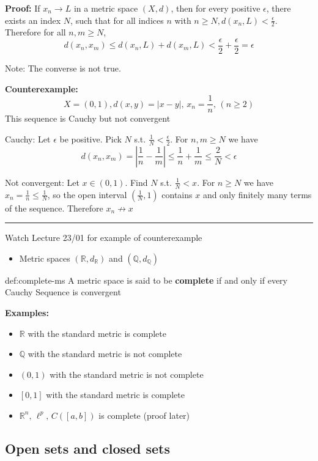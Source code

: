 \documentclass{article}
\begin{document}
\textbf{Proof: } If $x_{n}\to L$ in a metric space $(X,d)$, then for every positive $\epsilon$, there exists an index $N$, such that for all indices $n$ with $n\ge N, d(x_{n}, L) < \frac{\epsilon}{2}$. Therefore for all $n,m\ge N$,
\[d(x_{n}, x_{m})\le d(x_{n}, L) + d(x_{m}, L) < \frac{\epsilon}{2} +  \frac{\epsilon}{2} = \epsilon\]

Note: The converse is not true.

\textbf{Counterexample: }
\[X = (0,1), d(x,y) = \lvert x - y \rvert,\,x_{n} = \frac{1}{n},\,(n\ge 2)\]
This sequence is Cauchy but not convergent

Cauchy: Let $\epsilon$ be positive. Pick $N$ s.t. $\frac{1}{N} < \frac{\epsilon}{2}$. For $n,m\ge N$ we have
\[d(x_{n}, x_{m}) = \left\lvert \frac{1}{n} - \frac{1}{m} \right\rvert \le \frac{1}{n} + \frac{1}{m} \le \frac{2}{N} < \epsilon\]

Not convergent: Let $x\in (0,1)$. Find $N$ s.t. $\frac{1}{N}< x$. For $n\ge N$ we have $x_{n} = \frac{1}{n} \le \frac{1}{N}$, so the open interval $(\frac{1}{N}, 1)$ contains $x$ and only finitely many terms of the sequence. Therefore $x_{n}\not\to x$

\noindent\rule{\textwidth}{0.2pt}
Watch Lecture 23/01 for example of counterexample
\begin{itemize}
    \item Metric spaces $(\mathbb{R}, d_{\mathbb{R}})$ and $(\mathbb{Q}, d_{\mathbb{Q}})$
\end{itemize}

\begin{dfn}{def:complete-ms}{}
    A metric space is said to be \textbf{complete} if and only if every Cauchy Sequence is convergent
\end{dfn}

\textbf{Examples:}
\begin{itemize}
    \item $\mathbb{R}$ with the standard metric is complete
    \item $\mathbb{Q}$ with the standard metric is not complete
    \item $(0,1)$ with the standard metric is not complete
    \item $[0,1]$ with the standard metric is complete
    \item $\mathbb{R}^{n},\,\ell^{p},\,C([a,b])$ is complete (proof later)
\end{itemize} 

\subsection{Open sets and closed sets}
\end{document}
